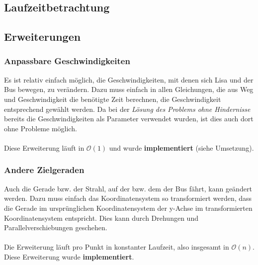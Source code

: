 \documentclass[a4paper, notitlepage, 12pt]{scrartcl}
\begin{document}
 \subsection{Laufzeitbetrachtung}
 \subsection{Erweiterungen}
 \subsubsection{Anpassbare Geschwindigkeiten}
 Es ist relativ einfach möglich, die Geschwindigkeiten, mit denen sich Lisa und der Bus bewegen, zu verändern. Dazu muss einfach in allen Gleichungen, die aus Weg und Geschwindigkeit die benötigte Zeit berechnen, die Geschwindigkeit entsprechend gewählt werden. Da bei der \emph{Lösung des Problems ohne Hindernisse} bereits die Geschwindigkeiten als Parameter verwendet wurden, ist dies auch dort ohne Probleme möglich. \\ \\
 Diese Erweiterung läuft in $\mathcal{O}(1)$ und wurde \textbf{implementiert} (siehe Umsetzung).
 \subsubsection{Andere Zielgeraden}
 Auch die Gerade bzw. der Strahl, auf der bzw. dem der Bus fährt, kann geändert werden. Dazu muss einfach das Koordinatensystem so transformiert werden, dass die Gerade im ursprünglichen Koordinatensystem der y-Achse im transformierten Koordinatensystem entspricht. Dies kann durch Drehungen und Parallelverschiebungen geschehen. \\ \\
 Die Erweiterung läuft pro Punkt in konstanter Laufzeit, also insgesamt in $\mathcal{O}(n)$. Diese Erweiterung wurde \textbf{implementiert}.
\end{document}
